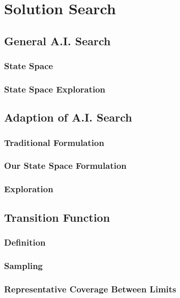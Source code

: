 								\chapter{Solution Search}

\section{General A.I. Search}

	\subsection{State Space}

	\subsection{State Space Exploration}

\section{Adaption of A.I. Search}

	\subsection{Traditional Formulation}

	\subsection{Our State Space Formulation}

	\subsection{Exploration}

\section{Transition Function}

	\subsection{Definition}

	\subsection{Sampling}

	\subsection{Representative Coverage Between Limits}

